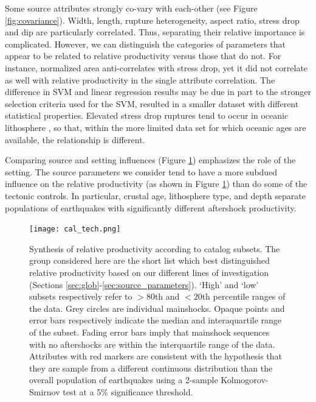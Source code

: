 \documentclass[draft, jgrga]{agujournal2018}
\begin{document}

Some source attributes strongly co-vary with each-other (see Figure \ref{fig:covariance}). Width, length, rupture heterogeneity, aspect ratio, stress drop and dip are particularly correlated. Thus, separating their relative importance is complicated. However, we can distinguish the categories of parameters that appear to be related to relative productivity versus those that do not. For instance, normalized area anti-correlates with stress drop, yet it did not correlate as well with relative productivity in the single attribute correlation. The difference in SVM and linear regression results may be due in part to the stronger selection criteria used for the SVM, resulted in a smaller dataset with different statistical properties. Elevated stress drop ruptures tend to occur in oceanic lithosphere \citep{choy2004apparent}, so that, within the more limited data set for which oceanic ages are available, the relationship is different.

Comparing source and setting influences (Figure \ref{fig:caltech}) emphasizes the role of the setting. The source parameters we consider tend to have a more subdued influence on the relative productivity (as shown in Figure \ref{fig:caltech}) than do some of the tectonic controls. In particular, crustal age, lithosphere type, and depth separate populations of earthquakes with significantly different aftershock productivity.

 \begin{figure}
        \centering
        \texttt{[image: cal\_tech.png]}
        \caption{Synthesis of relative productivity according to catalog subsets. The group considered here are the short list which best distinguished relative productivity based on our different lines of investigation (Sections \ref{sec:glob}-\ref{sec:source_parameters}). `High' and `low' subsets respectively refer to $>80$th and $<20$th percentile ranges of the data. Grey circles are individual mainshocks. Opaque points and error bars respectively indicate the median and interaquartile range of the subset. Fading error bars imply that mainshock sequences with no aftershocks are within the interquartile range of the data. Attributes with red markers are consistent with the hypothesis that they are sample from a different continuous distribution than the overall population of earthquakes using a 2-sample Kolmogorov-Smirnov test at a 5\% significance threshold.}
        \label{fig:caltech}
    \end{figure}
\end{document}
